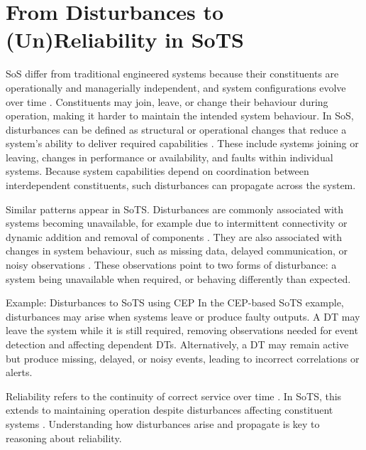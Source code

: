 \section{From Disturbances to (Un)Reliability in SoTS}\label{sec:disturbances-to-unreliability}
SoS differ from traditional engineered systems because their constituents are operationally and managerially independent, and system configurations evolve over time \cite{maier1998architecting}. Constituents may join, leave, or change their behaviour during operation, making it harder to maintain the intended system behaviour. In SoS, disturbances can be defined as structural or operational changes that reduce a system's ability to deliver required capabilities \cite{ferreira2023towards}. These include systems joining or leaving, changes in performance or availability, and faults within individual systems. Because system capabilities depend on coordination between interdependent constituents, such disturbances can propagate across the system.

Similar patterns appear in SoTS. Disturbances are commonly associated with systems becoming unavailable, for example due to intermittent connectivity or dynamic addition and removal of components \cite{parri2019jarvis,human2023design,howard2021greenhouse}. They are also associated with changes in system behaviour, such as missing data, delayed communication, or noisy observations \cite{esterle2021digital,gill2022method,chen2018digital,duan2023digital}. These observations point to two forms of disturbance: a system being unavailable when required, or behaving differently than expected.

\begin{runningexample}{Example: Disturbances to SoTS using CEP}
% 
In the CEP-based SoTS example, disturbances may arise when systems leave or produce faulty outputs. A DT may leave the system while it is still required, removing observations needed for event detection and affecting dependent DTs. Alternatively, a DT may remain active but produce missing, delayed, or noisy events, leading to incorrect correlations or alerts.\end{runningexample}

Reliability refers to the continuity of correct service over time \cite{avizienis2004basic}. In SoTS, this extends to maintaining operation despite disturbances affecting constituent systems \cite{ferreira2023towards}. Understanding how disturbances arise and propagate is key to reasoning about reliability.

